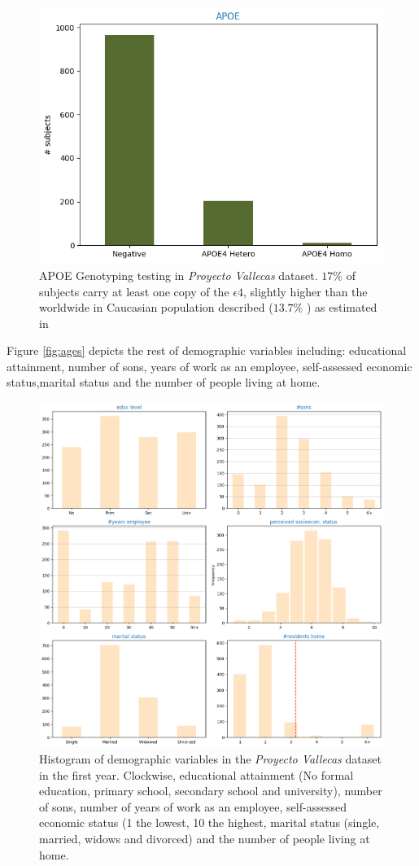 \documentclass[11pt]{article}
\theoremstyle{definition}
\theoremstyle{remark}
\begin{document}
\begin{figure}[H]
        \centering
        \includegraphics[keepaspectratio, width=0.5\linewidth]{figures/Fig_apoe}
        \caption{APOE Genotyping testing in \emph{Proyecto Vallecas} dataset. $17\%$ of subjects carry at least one copy of the $\epsilon4$, slightly higher than the worldwide in Caucasian population described ($13.7\%$ ) as estimated in \cite{farrer1997effects}} 
        \label{fig:demo}
\end{figure}

Figure \ref{fig:ages} depicts the rest of demographic variables including: educational attainment,  number of sons, years of work as an employee, self-assessed economic status,marital status and the  number of people living at home.
\begin{figure}[H]
        \centering
        \includegraphics[keepaspectratio, width=0.5\linewidth]{figures/Fig_demo}
        \caption{Histogram of demographic variables in the \emph{Proyecto Vallecas} dataset in the first year. Clockwise, educational attainment (No formal education, primary school, secondary school and university),  number of sons, number of years of work as an employee, self-assessed economic status (1 the lowest, 10 the highest, marital status (single, married, widows and divorced) and the  number of people living at home.} 
        \label{fig:demo}
\end{figure}
\end{document}
